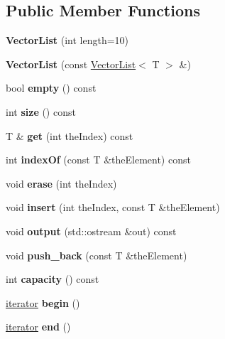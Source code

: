 \subsection*{Public Member Functions}
\begin{DoxyCompactItemize}
\item 
\mbox{\label{classVectorList_a125d5866d0d98b696c996d9f4b7d87af}} 
{\bfseries Vector\+List} (int length=10)
\item 
\mbox{\label{classVectorList_a5fa6e7518053eba69818ec99acb92a71}} 
{\bfseries Vector\+List} (const \hyperlink{classVectorList}{Vector\+List}$<$ T $>$ \&)
\item 
\mbox{\label{classVectorList_a7ba6e916d1d9f0f3c3b73883eaf9fc9a}} 
bool {\bfseries empty} () const
\item 
\mbox{\label{classVectorList_a914cc0d95c50c2525e72dc61cb5b86c7}} 
int {\bfseries size} () const
\item 
\mbox{\label{classVectorList_a3f2d17e63ce64a5cd32c4283544779d8}} 
T \& {\bfseries get} (int the\+Index) const
\item 
\mbox{\label{classVectorList_a1cc6db97a3a9abee9f2d6d002695f1a9}} 
int {\bfseries index\+Of} (const T \&the\+Element) const
\item 
\mbox{\label{classVectorList_ad6aa0bb07676f23de797dfa9ba4f3d7b}} 
void {\bfseries erase} (int the\+Index)
\item 
\mbox{\label{classVectorList_ad64994fce0685742e46e3b27d4dd6d40}} 
void {\bfseries insert} (int the\+Index, const T \&the\+Element)
\item 
\mbox{\label{classVectorList_aa65ee0290429edf9fb1566880df23704}} 
void {\bfseries output} (std\+::ostream \&out) const
\item 
\mbox{\label{classVectorList_a4c51e98c987b77b6c76476f5d6cddcd6}} 
void {\bfseries push\+\_\+back} (const T \&the\+Element)
\item 
\mbox{\label{classVectorList_ae62bab6c720f860f4eda0d4b4ea1f629}} 
int {\bfseries capacity} () const
\item 
\mbox{\label{classVectorList_ada561e1f71ba030f89638ecc86576724}} 
\hyperlink{classiterator}{iterator} {\bfseries begin} ()
\item 
\mbox{\label{classVectorList_af568c506954c234b8dcbdc2ee9846e47}} 
\hyperlink{classiterator}{iterator} {\bfseries end} ()
\end{DoxyCompactItemize}
